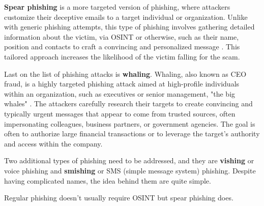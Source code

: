 \textbf{Spear phishing} is a more targeted version of phishing, where attackers customize their deceptive emails to a target individual or organization. Unlike with generic phishing attempts, this type of phishing involves gathering detailed information about the victim, via OSINT or otherwise, such as their name, position and contacts to craft a convincing and personalized message \citep{salahdine_social_2019}. This tailored approach increases the likelihood of the victim falling for the scam.

Last on the list of phishing attacks is \textbf{whaling}. Whaling, also known as CEO fraud, is a highly targeted phishing attack aimed at high-profile individuals within an organization, such as executives or senior management, "the big whales" \citep{abraham_overview_2010}. The attackers carefully research their targets to create convincing and typically urgent messages that appear to come from trusted sources, often impersonating colleagues, business partners, or government agencies. The goal is often to authorize large financial transactions or to leverage the target's authority and access within the company.

Two additional types of phishing need to be addressed, and they are \textbf{vishing} or voice phishing and \textbf{smishing} or SMS (simple message system) phishing. Despite having complicated names, the idea behind them are quite simple.

Regular phishing doesn't usually require OSINT but spear phishing does.


\begin{comment}
    
    -

\end{comment}



\begin{comment}
    
    - 

\end{comment}

